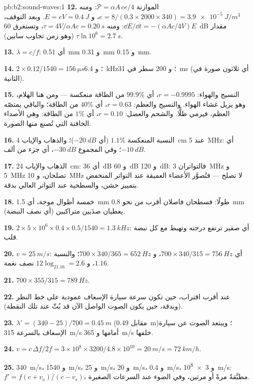 \begin{solution}{pb:b2:sound-waves:1}
\textbf{12.} الموازنة $\mathcal P = \alpha A\,ce/4$: ومنه $e = 8/(0.3 \times 2000 \times 340) =
\qty{3.9e-5}{J/m^3}$، و $E = eV = \qty{0.4}{J}$. وبعد التوقف، $\dd E/\dd t = -(\alpha Ac
/4V)E$: ومنه $\tau = 4V/\alpha Ac = \qty{0.20}{s}$، وتستغرق \qty{60}{dB} مقدار $\tau\ln10^6 =
\qty{2.7}{s}$ (وهو زمن تجاوب سابين).

\textbf{13.} $\lambda = c/f$: أي \qty{0.51}{mm} و \qty{0.31}{mm} و \qty{0.15}{mm}.

\textbf{14.} $2 \times 0.12/1540 = \qty{156}{\micro s}$؛ و \qty{6.4}{kHz}؛ و $200$ سطر في
\qty{31}{ms} (أي ثلاثون صورة في الثانية).

\textbf{15.} النسيج والهواء: $r = -0.9995$، أي $99.9\%$ من الطاقة منعكسة
--- ومن هنا الهلام، وهو يزيل غشاء الهواء. والنسيج والعظم: $r = 0.63$،
أي $40\%$ من الطاقة؛ والباقي يمتصّه العظم، فيرمي
ظلًّا. والشحم والعضل: $r = 0.10$، أي $1\%$ من الطاقة: وهي الأصداء الخافتة التي
تُصنع منها الصورة.

\textbf{16.} النسبة المنعكسة $1.1\%$ (أي $-\qty{20}{dB}$)؛ والذهاب والإياب
\qty{4}{cm} عند \qty{5}{MHz}: أي $-\qty{10}{dB}$؛ وفي المجموع $-\qty{30}{dB}$، أي جزء من ألف.

\textbf{17.} الذهاب والإياب \qty{24}{cm}: أي \qty{36}{dB} و \qty{60}{dB} و \qty{120}{dB}: فالتواتران \qty{3}{MHz}
و \qty{5}{MHz} تصلحان، و \qty{10}{MHz} لا تصلح --- فتُصوَّر الأعضاء العميقة عند
التواتر المنخفض بتمييز خشن، والسطحية عند التواتر
العالي بدقة.

\textbf{18.} خمسة أطوال موجة، أي \qty{1.5}{mm} طولًا: فسطحان فاصلان أقرب
من نحو \qty{0.8}{mm} (أي نصف النبضة) يعطيان صدَيين متراكبين.

\textbf{19.} $2 \times 5 \times 10^6 \times 0.4 \times 0.5/1540 = \qty{1.3}{kHz}$: أي صفير
ترتفع درجته وتهبط مع كل نبضة قلب.

\textbf{20.} $v = \qty{25}{m/s}$: أي $700 \times 340/315 = \qty{756}{Hz}$، و $700 \times 340/365 =
\qty{652}{Hz}$؛ والنسبة $1.16$، و $12\log_21.16 = 2.6$ نصف نغمة.

\textbf{21.} $700 \times 355/315 = \qty{789}{Hz}$.

\textbf{22.} عند أقرب اقتراب، حين تكون سرعة سيارة الإسعاف
عمودية على خط النظر (وبدقة، حين يكون الصوت الواصل
الآن قد بُثّ عند تلك النقطة).

\textbf{23.} $\lambda' = (340 - 25)/700 = \qty{0.45}{m}$ (مقابل \qty{0.49}{m})؛ ويبتعد
الصوت عن سيارة الإسعاف بالسرعة \qty{315}{m/s} أمامها و \qty{365}{m/s}
خلفها.

\textbf{24.} $v = c\,\Delta f/2f = 3 \times 10^8 \times 3200/4.8 \times 10^{10} = \qty{20}{m/s} =
\qty{72}{km/h}$.

\textbf{25.} \qty{340}{m/s}، و \qty{1540}{m/s}، و \qty{25}{m/s}، و \qty{20}{m/s}، و \qty{0.4}{m/s}،
و \qty{3e8}{m/s}: $f' = f(c + v_o)/(c - v_s)$، مطبَّقةً مرةً أو مرتين، وفي
الضوء عند السرعات الصغيرة.
\end{solution}
